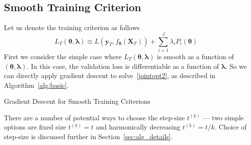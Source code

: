 \documentclass[12pt,letterpaper]{article}
\begin{document}
\subsection{Smooth Training Criterion}
Let us denote the training criterion as follows
\begin{equation}
L_T\left(\boldsymbol \theta, \boldsymbol{\lambda}\right) \equiv L(\boldsymbol{y}_T, f_{\boldsymbol \theta} (\boldsymbol{X}_T)) + \sum\limits_{i=1}^J \lambda_i P_i(\boldsymbol \theta)
\label{train}
\end{equation}
First we consider the simple case where $L_T\left(\boldsymbol \theta, \boldsymbol{\lambda}\right)$ is smooth as a function of $(\boldsymbol \theta, \boldsymbol{\lambda})$. In this case, the validation loss is differentiable as a function of $\boldsymbol{\lambda}$. So we can directly apply gradient descent to solve~\eqref{jointopt2}, as described in Algorithm~\ref{alg:basic}.

\begin{algorithm}
\caption{Gradient Descent for Smooth Training Criterions}
\label{alg:basic}
\begin{algorithmic}
	\ENDFOR
\end{algorithmic}
\end{algorithm}
There are a number of potential ways to choose the step-size $t^{(k)}$ --- two simple options are fixed size $t^{(k)} = t$ and harmonically decreasing $t^{(k)} = t/k$. Choice of step-size is discussed further in Section~\ref{sec:alg_details}.\\
\vspace{1mm}
\end{document}
